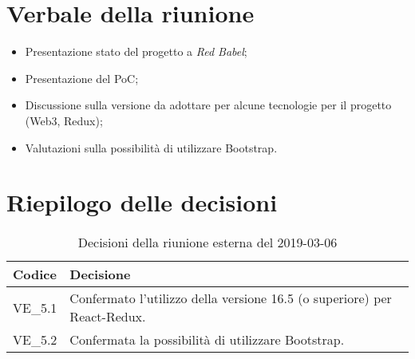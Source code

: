 \section{Verbale della riunione}
\begin{itemize}
	\item Presentazione stato del progetto a \textit{Red Babel};
	\item Presentazione del PoC;
	\item Discussione sulla versione da adottare per alcune tecnologie per il progetto (Web3, Redux);
	\item Valutazioni sulla possibilità di utilizzare Bootstrap.

\end{itemize}

\hspace{3cm}

\section{Riepilogo delle decisioni}

	
	\begin{longtable}{ >{\centering}p{} >{}p{}}
		\caption{Decisioni della riunione esterna del 2019-03-06}\\	
		\rowcolorhead
		\textbf{\color{white}Codice} 
		& \centering\textbf{\color{white}Decisione} 
		\tabularnewline 
		\endfirsthead
		VE\_5.1 & Confermato l'utilizzo della versione 16.5 (o superiore) per 
		React-Redux.
		\tabularnewline
		VE\_5.2 & Confermata la possibilità di utilizzare Bootstrap.
		
		
		
		
	\end{longtable}
	




